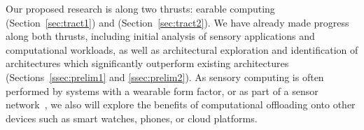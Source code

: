 Our proposed research is along two thrusts: earable computing
(Section~\ref{sec:tract1}) and \olfc{} (Section~\ref{sec:tract2}).  We have
already made progress along both thrusts, including initial analysis of sensory
applications and computational workloads, as well as architectural exploration
and identification of architectures which significantly outperform existing
architectures (Sections~\ref{ssec:prelim1} and \ref{ssec:prelim2}).  As sensory
computing is often performed by systems with a wearable form factor, or as part
of a sensor network~\cite{}, we also will explore the benefits of computational
offloading onto other devices such as smart watches, phones, or cloud
platforms.
